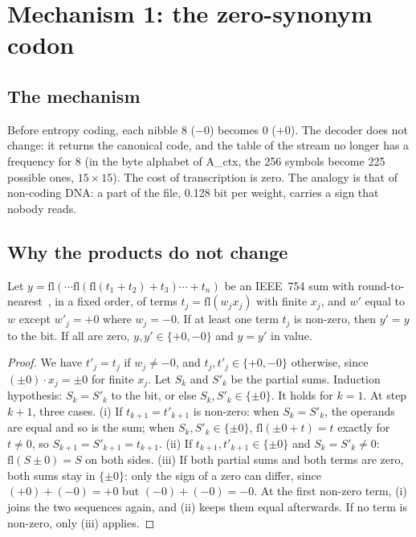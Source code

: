 \section{Mechanism 1: the zero-synonym codon}\label{t3ecl:sec:zero}

\subsection{The mechanism}

Before entropy coding, each nibble 8 ($-0$) becomes 0 ($+0$). The decoder does not change: it returns the canonical code, and the table of the stream no longer has a frequency for 8 (in the byte alphabet of A\_ctx, the 256 symbols become 225 possible ones, $15 \times 15$). The cost of transcription is zero. The analogy is that of non-coding DNA: a part of the file, 0.128 bit per weight, carries a sign that nobody reads.

\subsection{Why the products do not change}

\begin{proposition}\label{t3ecl:prop:zero}
Let $y = \mathrm{fl}(\cdots\mathrm{fl}(\mathrm{fl}(t_1 + t_2) + t_3)\cdots + t_n)$ be an IEEE~754 sum with round-to-nearest~\cite{ieee754}, in a fixed order, of terms $t_j = \mathrm{fl}(w_j x_j)$ with finite $x_j$, and $w'$ equal to $w$ except $w'_j = +0$ where $w_j = -0$. If at least one term $t_j$ is non-zero, then $y' = y$ to the bit. If all are zero, $y, y' \in \{+0, -0\}$ and $y = y'$ in value.
\end{proposition}

\begin{proof}
We have $t'_j = t_j$ if $w_j \ne -0$, and $t_j, t'_j \in \{+0, -0\}$ otherwise, since $(\pm0)\cdot x_j = \pm0$ for finite $x_j$. Let $S_k$ and $S'_k$ be the partial sums. Induction hypothesis: $S_k = S'_k$ to the bit, or else $S_k, S'_k \in \{\pm0\}$. It holds for $k = 1$. At step $k+1$, three cases. (i) If $t_{k+1} = t'_{k+1}$ is non-zero: when $S_k = S'_k$, the operands are equal and so is the sum; when $S_k, S'_k \in \{\pm0\}$, $\mathrm{fl}(\pm0 + t) = t$ exactly for $t \ne 0$, so $S_{k+1} = S'_{k+1} = t_{k+1}$. (ii) If $t_{k+1}, t'_{k+1} \in \{\pm0\}$ and $S_k = S'_k \ne 0$: $\mathrm{fl}(S \pm 0) = S$ on both sides. (iii) If both partial sums and both terms are zero, both sums stay in $\{\pm0\}$: only the sign of a zero can differ, since $(+0) + (-0) = +0$ but $(-0) + (-0) = -0$. At the first non-zero term, (i) joins the two sequences again, and (ii) keeps them equal afterwards. If no term is non-zero, only (iii) applies.
\end{proof}

